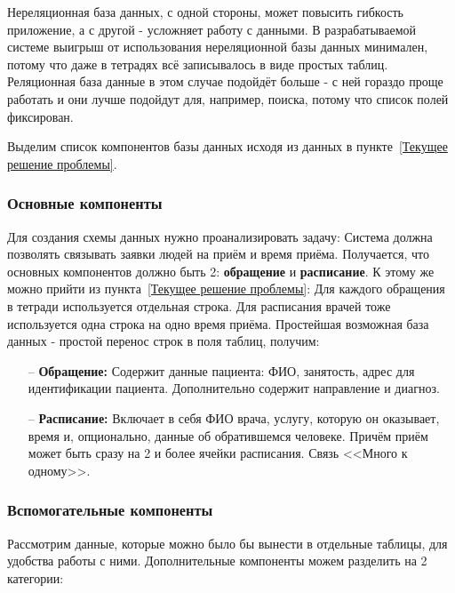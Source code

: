 \documentclass[a4paper,article]{article}
\begin{document}
    Нереляционная база данных, с одной стороны, может повысить гибкость приложение, а с другой - усложняет работу с данными. В разрабатываемой системе выигрыш от использования нереляционной базы данных минимален, потому что даже в тетрадях всё записывалось в виде простых таблиц. Реляционная база данные в этом случае подойдёт больше - с ней гораздо проще работать и они лучше подойдут для, например, поиска, потому что список полей фиксирован.

    Выделим список компонентов базы данных исходя из данных в пункте~\ref{Текущее решение проблемы}.

    \subsubsection{Основные компоненты}\label{Проектирование БД. Основные компоненты}

    Для создания схемы данных нужно проанализировать задачу: Система должна позволять связывать заявки людей на приём и время приёма. Получается, что основных компонентов должно быть 2: \textbf{обращение} и \textbf{расписание}. К этому же можно прийти из пункта~\ref{Текущее решение проблемы}: Для каждого обращения в тетради используется отдельная строка. Для расписания врачей тоже используется одна строка на одно время приёма. Простейшая возможная база данных - простой перенос строк в поля таблиц, получим:

    \begin{itemize}[nolistsep]
        \item[--] \textbf{Обращение:} Содержит данные пациента: ФИО, занятость, адрес для идентификации пациента. Дополнительно содержит направление и диагноз.
        \item[--] \textbf{Расписание:} Включает в себя ФИО врача, услугу, которую он оказывает, время и, опционально, данные об обратившемся человеке. Причём приём может быть сразу на 2 и более ячейки расписания. Связь <<Много к одному>>.
    \end{itemize}

    \subsubsection{Вспомогательные компоненты}\label{Проектирование БД. Вспомогательные компоненты}

    Рассмотрим данные, которые можно было бы вынести в отдельные таблицы, для удобства работы с ними. Дополнительные компоненты можем разделить на 2 категории:
\end{document}
